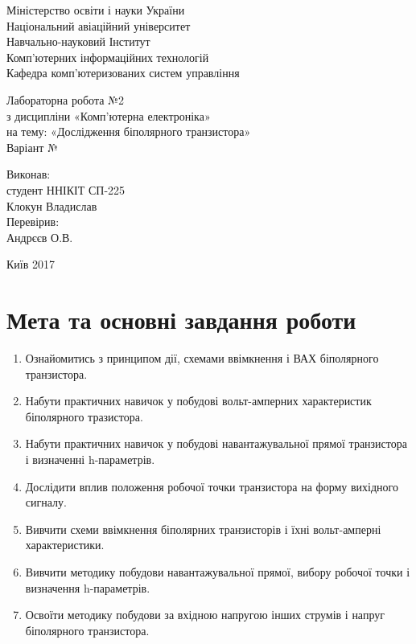 \documentclass[a4paper,oneside,12pt,DIV=12,titlepage]{scrartcl}
\begin{document}
	\begin{titlepage}
		\begin{center}
			Міністерство освіти і науки України\\
			Національний авіаційний університет\\
			Навчально-науковий Інститут\\
			Комп'ютерних інформаційних технологій\\
			Кафедра комп'ютеризованих систем управління
			
			\vspace{\fill}
				Лабораторна робота №2\\
				з дисципліни «Комп'ютерна електроніка»\\
				на тему: «Дослідження біполярного транзистора»\\
				Варіант №
				
			\vspace{\fill}
			
			\begin{flushright}
				Виконав:\\
				студент ННІКІТ СП-225\\
				Клокун Владислав\\
				Перевірив:\\
				Андрєєв О.В.
			\end{flushright}
			Київ 2017
		\end{center}
	\end{titlepage}
	
	\section{Мета та основні завдання роботи}
		\begin{enumerate}
			\item Ознайомитись з принципом дії, схемами ввімкнення і ВАХ біполярного транзистора.
			\item Набути практичних навичок у побудові вольт-амперних характеристик біполярного тразистора.
			\item Набути практичних навичок у побудові навантажувальної прямої транзистора і визначенні h-параметрів.
			\item Дослідити вплив положення робочої точки транзистора на форму вихідного сигналу.
			\item Вивчити схеми ввімкнення біполярних транзисторів і їхні вольт-амперні характеристики.
			\item Вивчити методику побудови навантажувальної прямої, вибору робочої точки і визначення h-параметрів.
			\item Освоїти методику побудови за вхідною напругою інших струмів і напруг біполярного транзистора.
		\end{enumerate}
		
\end{document}
